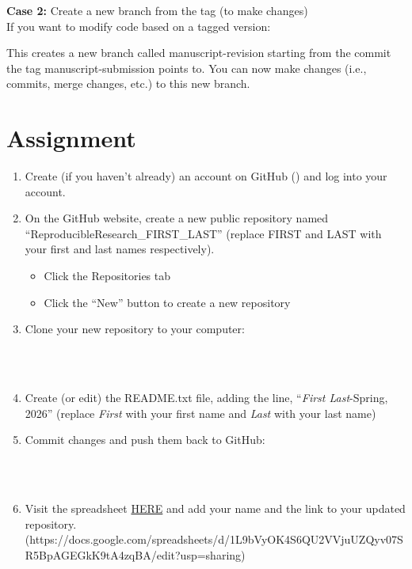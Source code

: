 \noindent \textbf{Case 2:} Create a new branch from the tag (to make changes)\\
\noindent If you want to modify code based on a tagged version:
\begin{terminal}
\end{terminal}
\noindent This creates a new branch called manuscript-revision starting from the commit the tag manuscript-submission points to. You can now make changes (i.e., commits, merge changes, etc.) to this new branch.

\newpage
\section{Assignment}
\begin{enumerate}
\item Create (if you haven't already) an account on GitHub () and log into your account.

\item On the GitHub website, create a new public repository named ``ReproducibleResearch\_FIRST\_LAST'' (replace FIRST and LAST with your first and last names respectively).

	\begin{itemize}
	\item Click the Repositories tab
	\item Click the ``New'' button to create a new repository
	\end{itemize}
\item Clone your new repository to your computer:
	\begin{terminal}
	\\
	\\
	\end{terminal}
	
\item Create (or edit) the README.txt file, adding the line, ``\textit{First Last}-Spring, 2026'' (replace \textit{First} with your first name and \textit{Last} with your last name)

\item Commit changes and push them back to GitHub:
	\begin{terminal}
	\\
	\\
	\terminalinput{git push origin main}
	\end{terminal}
	
\item Visit the spreadsheet \href{https://docs.google.com/spreadsheets/d/1L9bVyOK4S6QU2VVjuUZQyv07SR5BpAGEGkK9tA4zqBA/edit?usp=sharing}{HERE} and add your name and the link to your updated repository.\\
\footnotesize{(https://docs.google.com/spreadsheets/d/1L9bVyOK4S6QU2VVjuUZQyv07SR5BpAGEGkK9tA4zqBA/edit?usp=sharing)}
	
\end{enumerate}

\printglossary[type=reproducibleresearch,style=twocolumn]
\newpage

\renewcommand{\bibname}{References}

